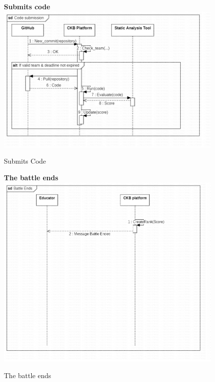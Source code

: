 \begin{enumerate}[label=\textbf{[UC\arabic*]}]
\begin{enumerate}[label=\textbf{[UC\arabic*]}]
    \begin{figure}
    \item \textbf{Submits code}
        \centering
        \includegraphics[width= \textwidth]{Images/Code submission.jpg}
        \caption{Submits Code}
        \label{fig:enter-label}
    \end{figure}

    \begin{figure}
    \item \textbf{The battle ends}
        \centering
        \includegraphics[width= \textwidth]{Images/Battle Ends.jpg}
        \caption{The battle ends}
        \label{fig:enter-label}
    \end{figure}
    

\end{enumerate}
\end{enumerate}
